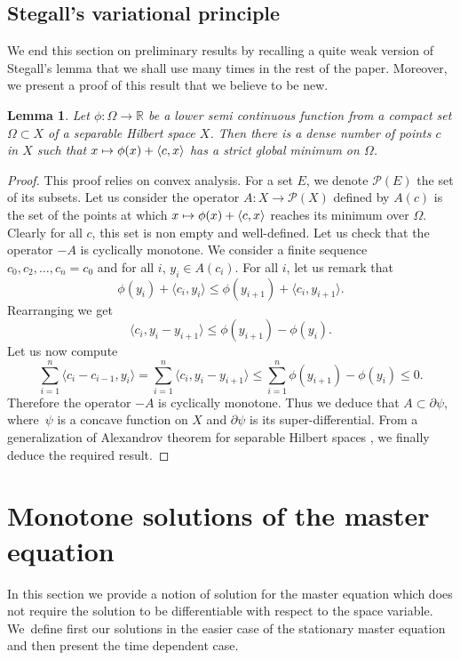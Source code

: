 \documentclass[10pt]{amsart}
\let\mathcal\mathscr
\newcommand\mto{\mathchoice{\longmapsto}{\mapsto}{\mapsto}{\mapsto}}
\newtheorem{Lemma}{Lemma}[section]
\theoremstyle{definition}
\begin{document}
\subsection{Stegall's variational principle}
We end this section on preliminary results by recalling a quite weak version of Stegall's lemma \cite{stegall1978optimization,stegall1986optimization,fabian2007stegall} that we shall use many times in the rest of the paper. Moreover, we present a proof of this result that we believe to be new.
\begin{Lemma}\label{stegall}
Let $\phi: \Omega \to \mathbb{R}$ be a lower semi continuous function from a compact set $\Omega \subset X$ of a separable Hilbert space $X$. Then there is a dense number of points $c$ in $X$ such that $x \mto \phi(x)+\langle c,x\rangle$ has a strict global minimum on $\Omega$.
\end{Lemma}
\begin{proof}
This proof relies on convex analysis. For a set $E$, we denote $\mathcal{P}(E)$ the set of its subsets. Let us consider the operator $A: X \to \mathcal{P}(X)$ defined by $A(c)$ is the set of the points at which $x \mto \phi(x)+\langle c,x\rangle$ reaches its minimum over $\Omega$. Clearly for all $c$, this set is non empty and well-defined. Let us check that the operator $-A$ is cyclically monotone. We consider a finite sequence $c_0,c_2,\dots,c_n = c_0$ and for all $i$, $y_i \in A(c_i)$. For all $i$, let us remark that
\begin{equation*}
\phi(y_i)+\langle c_i, y_i\rangle \leq \phi(y_{i+1})+\langle c_i, y_{i+1} \rangle.
\end{equation*}
Rearranging we get
\begin{equation*}
\langle c_i, y_i-y_{i+1}\rangle \leq \phi(y_{i+1})-\phi(y_i).
\end{equation*}
Let us now compute
\begin{equation*}
\sum_{i =1}^n \langle c_i-c_{i-1}, y_i \rangle = \sum_{i =1}^n \langle c_i, y_i-y_{i+1} \rangle \leq \sum_{i = 1}^n \phi(y_{i+1})-\phi(y_i) \leq 0.
\end{equation*}
Therefore the operator $-A$ is cyclically monotone. Thus we deduce that $A \subset \partial \psi$, where~$\psi$ is a concave function on $X$ and $\partial \psi$ is its super-differential. From a generalization of Alexandrov theorem for separable Hilbert spaces \cite{borwein1994second}, we finally deduce the required result.
\end{proof}

\section{Monotone solutions of the master equation}\label{sectionmon}
In this section we provide a notion of solution for the master equation which does not require the solution to be differentiable with respect to the space variable. We~define first our solutions in the easier case of the stationary master equation and then present the time dependent case.
\end{document}
